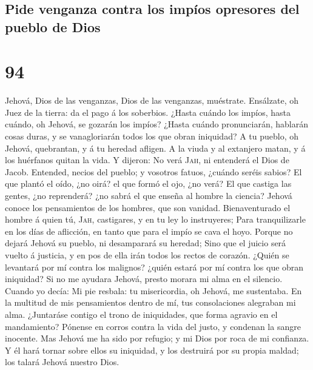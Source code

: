 \hypertarget{pide-venganza-contra-los-impuxedos-opresores-del-pueblo-de-dios}{%
\subsection{Pide venganza contra los impíos opresores del pueblo de
Dios}\label{pide-venganza-contra-los-impuxedos-opresores-del-pueblo-de-dios}}

\hypertarget{section-93}{%
\section{94}\label{section-93}}

 Jehová, Dios de las venganzas, Dios de las venganzas,
muéstrate.  Ensálzate, oh Juez de la tierra: da el pago á
los soberbios.  ¿Hasta cuándo los impíos, hasta cuándo, oh
Jehová, se gozarán los impíos?  ¿Hasta cuándo
pronunciarán, hablarán cosas duras, y se vanagloriarán todos los que
obran iniquidad?  A tu pueblo, oh Jehová, quebrantan, y á
tu heredad afligen.  A la viuda y al extanjero matan, y á
los huérfanos quitan la vida.  Y dijeron: No verá
\textsc{Jah}, ni entenderá el Dios de Jacob.  Entended,
necios del pueblo; y vosotros fatuos, ¿cuándo seréis sabios?
 El que plantó el oído, ¿no oirá? el que formó el ojo, ¿no
verá?  El que castiga las gentes, ¿no reprenderá? ¿no
sabrá el que enseña al hombre la ciencia?  Jehová conoce
los pensamientos de los hombres, que son vanidad. 
Bienaventurado el hombre á quien tú, \textsc{Jah}, castigares, y en tu
ley lo instruyeres;  Para tranquilizarle en los días de
aflicción, en tanto que para el impío se cava el hoyo. 
Porque no dejará Jehová su pueblo, ni desamparará su heredad;
 Sino que el juicio será vuelto á justicia, y en pos de
ella irán todos los rectos de corazón.  ¿Quién se
levantará por mí contra los malignos? ¿quién estará por mí contra los
que obran iniquidad?  Si no me ayudara Jehová, presto
morara mi alma en el silencio.  Cuando yo decía: Mi pie
resbala: tu misericordia, oh Jehová, me sustentaba.  En
la multitud de mis pensamientos dentro de mí, tus consolaciones
alegraban mi alma.  ¿Juntaráse contigo el trono de
iniquidades, que forma agravio en el mandamiento? 
Pónense en corros contra la vida del justo, y condenan la sangre
inocente.  Mas Jehová me ha sido por refugio; y mi Dios
por roca de mi confianza.  Y él hará tornar sobre ellos
su iniquidad, y los destruirá por su propia maldad; los talará Jehová
nuestro Dios.

